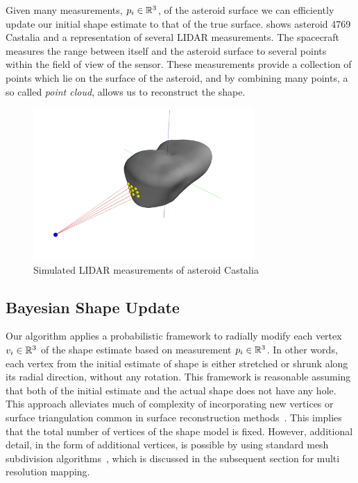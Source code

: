 \documentclass[journal]{new-aiaa}
\begin{document}
Given many measurements, \( p_i \in \mathbb{R}^3 \), of the asteroid surface we can efficiently update our initial shape estimate to that of the true surface.
 shows asteroid 4769 Castalia and a representation of several LIDAR measurements. 
The spacecraft measures the range between itself and the asteroid surface to several points within the field of view of the sensor. 
These measurements provide a collection of points which lie on the surface of the asteroid, and by combining many points, a so called \textit{point cloud}, allows us to reconstruct the shape.
\begin{figure}
    \centering
    \includegraphics[width=0.75\textwidth]{castalia_raycasting_plot.jpg}
    \caption{Simulated LIDAR measurements of asteroid Castalia~\label{fig:lidar_example}}
\end{figure}

\subsection{Bayesian Shape Update}

Our algorithm applies a probabilistic framework to radially modify each vertex \( v_i \in \mathbb{R}^3\) of the shape estimate based on measurement \( p_i \in \mathbb{R}^3 \). 
In other words, each vertex from the initial estimate of shape is either stretched or shrunk along its radial direction, without any rotation. 
This framework is reasonable assuming that both of the initial estimate and the actual shape does not have any hole. 
This approach alleviates much of complexity of incorporating new vertices or surface triangulation common in surface reconstruction methods~\cite{berg2008}.
This implies that the total number of vertices of the shape model is fixed.
However, additional detail, in the form of additional vertices, is possible by using standard mesh subdivision algorithms~\cite{orourke1998}, which is discussed in the subsequent section for multi resolution mapping.
\end{document}
